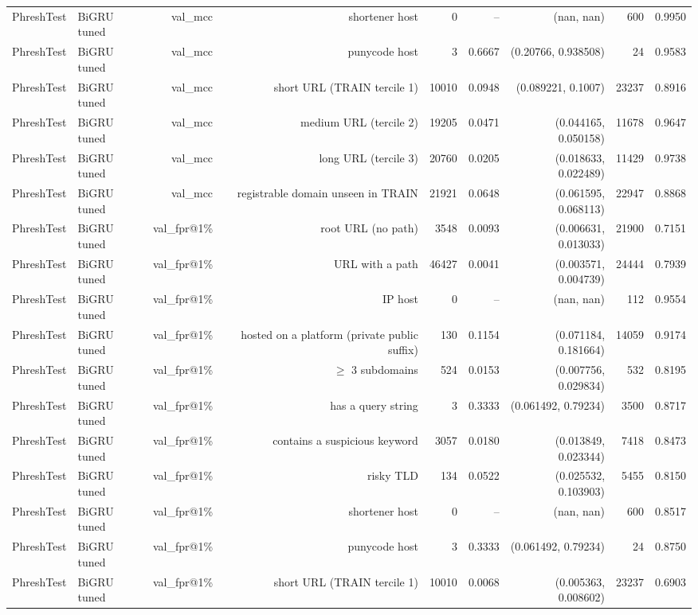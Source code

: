 \begin{table}[t]
\begin{tabular}{llrrrrrrr}
PhreshTest & BiGRU tuned & val\_mcc & shortener host & 0 & -- & (nan, nan) & 600 & 0.9950 \\
PhreshTest & BiGRU tuned & val\_mcc & punycode host & 3 & 0.6667 & (0.20766, 0.938508) & 24 & 0.9583 \\
PhreshTest & BiGRU tuned & val\_mcc & short URL (TRAIN tercile 1) & 10010 & 0.0948 & (0.089221, 0.1007) & 23237 & 0.8916 \\
PhreshTest & BiGRU tuned & val\_mcc & medium URL (tercile 2) & 19205 & 0.0471 & (0.044165, 0.050158) & 11678 & 0.9647 \\
PhreshTest & BiGRU tuned & val\_mcc & long URL (tercile 3) & 20760 & 0.0205 & (0.018633, 0.022489) & 11429 & 0.9738 \\
PhreshTest & BiGRU tuned & val\_mcc & registrable domain unseen in TRAIN & 21921 & 0.0648 & (0.061595, 0.068113) & 22947 & 0.8868 \\
PhreshTest & BiGRU tuned & val\_fpr@1\% & root URL (no path) & 3548 & 0.0093 & (0.006631, 0.013033) & 21900 & 0.7151 \\
PhreshTest & BiGRU tuned & val\_fpr@1\% & URL with a path & 46427 & 0.0041 & (0.003571, 0.004739) & 24444 & 0.7939 \\
PhreshTest & BiGRU tuned & val\_fpr@1\% & IP host & 0 & -- & (nan, nan) & 112 & 0.9554 \\
PhreshTest & BiGRU tuned & val\_fpr@1\% & hosted on a platform (private public suffix) & 130 & 0.1154 & (0.071184, 0.181664) & 14059 & 0.9174 \\
PhreshTest & BiGRU tuned & val\_fpr@1\% & $\geq$ 3 subdomains & 524 & 0.0153 & (0.007756, 0.029834) & 532 & 0.8195 \\
PhreshTest & BiGRU tuned & val\_fpr@1\% & has a query string & 3 & 0.3333 & (0.061492, 0.79234) & 3500 & 0.8717 \\
PhreshTest & BiGRU tuned & val\_fpr@1\% & contains a suspicious keyword & 3057 & 0.0180 & (0.013849, 0.023344) & 7418 & 0.8473 \\
PhreshTest & BiGRU tuned & val\_fpr@1\% & risky TLD & 134 & 0.0522 & (0.025532, 0.103903) & 5455 & 0.8150 \\
PhreshTest & BiGRU tuned & val\_fpr@1\% & shortener host & 0 & -- & (nan, nan) & 600 & 0.8517 \\
PhreshTest & BiGRU tuned & val\_fpr@1\% & punycode host & 3 & 0.3333 & (0.061492, 0.79234) & 24 & 0.8750 \\
PhreshTest & BiGRU tuned & val\_fpr@1\% & short URL (TRAIN tercile 1) & 10010 & 0.0068 & (0.005363, 0.008602) & 23237 & 0.6903 \\

\end{tabular}
\end{table}

